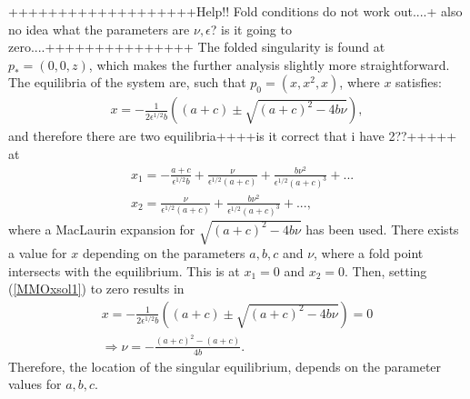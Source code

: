 +++++++++++++++++++Help!! Fold conditions do not work out....+ also no idea what the parameters are $\nu, \epsilon$? is it going to zero....+++++++++++++++
The folded singularity is found at $p_*= (0,0,z)$, which makes the further analysis slightly more straightforward.
The equilibria of the system are, such that $p_0= (x,x^2,x)$, where $x$ satisfies:
\begin{align}\label{MMOxsol1}
x = -\frac{1}{2 \epsilon^{1/2} b} \left( (a+c) \pm \sqrt{ (a+c)^2 - 4 b \nu } \right),
\end{align}
and therefore there are two equilibria++++is it correct that i have 2??+++++ at
\begin{align*}
&x_1=-\frac{a+c}{ \epsilon^{1/2} b} + \frac{\nu}{\epsilon^{1/2} (a+c)} + \frac{b \nu^2}{\epsilon^{1/2} (a+c)^3} + ... \\
&x_2= \frac{\nu}{\epsilon^{1/2} (a+c)} + \frac{b \nu^2}{\epsilon^{1/2} (a+c)^3} + ...,
\end{align*}
where a MacLaurin expansion for $\sqrt{ (a+c)^2 - 4 b \nu }$ has been used.
There exists a value for $x$ depending on the parameters $a,b,c$ and $\nu$, where a fold point intersects with the equilibrium. This is at $x_1=0$ and $x_2=0$.
Then, setting (\ref{MMOxsol1}) to zero results in
\begin{align*}
x=-\frac{1}{2 \epsilon^{1/2} b} \left( (a+c) \pm \sqrt{ (a+c)^2 - 4 b \nu } \right)=0\\
\Rightarrow \nu = - \frac{ (a+c)^2 - (a+c)}{4b}.
\end{align*}
Therefore, the location of the singular equilibrium, depends on the parameter values for $a,b,c$.

